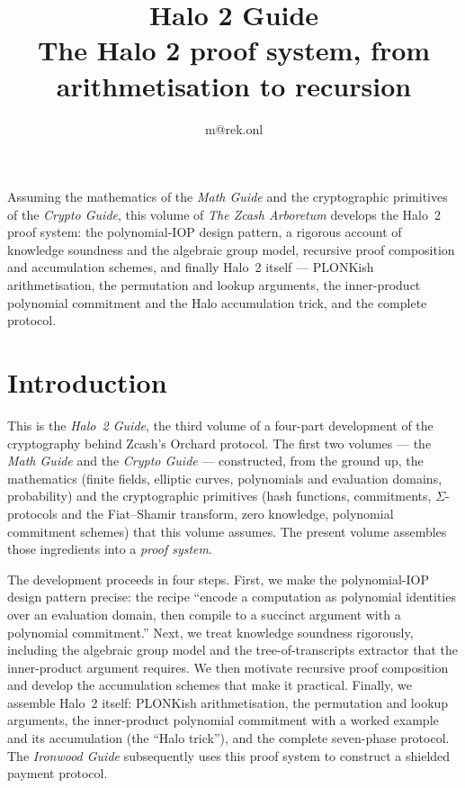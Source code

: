 \documentclass[11pt,a4paper]{article}
\title{\textbf{\Huge Halo 2 Guide}\\[6pt]\large The Halo 2 proof system, from arithmetisation to recursion}
\author{m@rek.onl}
\date{}
\theoremstyle{definition}
\renewenvironment{abstract}{%
  \small\begin{center}{\bfseries\abstractname}\end{center}\medskip\noindent\ignorespaces
}{\par\medskip}
\begin{document}
\maketitle
\thispagestyle{empty}
\begin{abstract}
Assuming the mathematics of the \emph{Math Guide} and the cryptographic primitives of the \emph{Crypto Guide}, this volume of \emph{The Zcash Arboretum} develops the Halo~2 proof system: the polynomial-IOP design pattern, a rigorous account of knowledge soundness and the algebraic group model, recursive proof composition and accumulation schemes, and finally Halo~2 itself --- PLONKish arithmetisation, the permutation and lookup arguments, the inner-product polynomial commitment and the Halo accumulation trick, and the complete protocol.
\end{abstract}
\clearpage
\tableofcontents
\clearpage

\section{Introduction}\label{sec:intro}
This is the \emph{Halo~2 Guide}, the third volume of a four-part development of the cryptography
behind Zcash's Orchard protocol. The first two volumes --- the \emph{Math Guide} and the
\emph{Crypto Guide} --- constructed, from the ground up, the mathematics (finite fields, elliptic curves,
polynomials and evaluation domains, probability) and the cryptographic primitives (hash functions,
commitments, $\Sigma$-protocols and the Fiat--Shamir transform, zero knowledge, polynomial
commitment schemes) that this volume assumes. The present volume assembles those ingredients into a
\emph{proof system}.

The development proceeds in four steps. First, we make the polynomial-IOP design pattern precise: the
recipe ``encode a computation as polynomial identities over an evaluation domain, then compile to a
succinct argument with a polynomial commitment.'' Next, we treat knowledge soundness rigorously,
including the algebraic group model and the tree-of-transcripts extractor that the inner-product
argument requires. We then motivate recursive proof composition and develop the accumulation
schemes that make it practical. Finally, we assemble Halo~2 itself:
PLONKish arithmetisation, the permutation and lookup arguments, the inner-product polynomial
commitment with a worked example and its accumulation (the ``Halo trick''), and the complete
seven-phase protocol. The \emph{Ironwood Guide} subsequently uses this proof system to construct a shielded
payment protocol.
\end{document}
